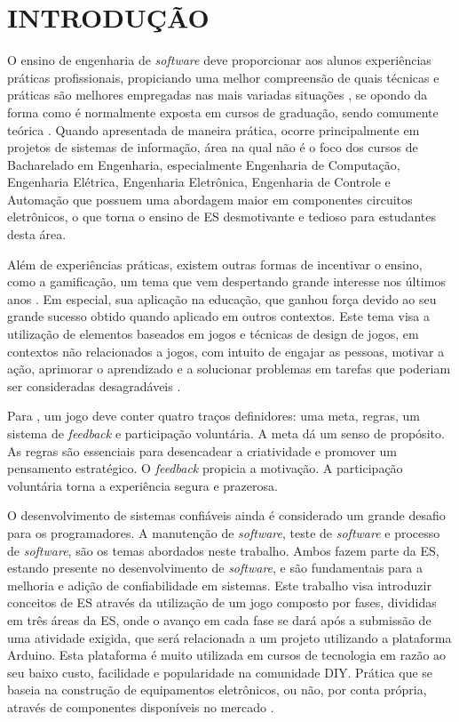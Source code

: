 
\chapter{INTRODUÇÃO}
\label{chap:introducao}

O ensino de engenharia de \textit{software} deve proporcionar aos alunos experiências práticas profissionais, propiciando uma melhor compreensão de quais técnicas e práticas são melhores empregadas nas mais variadas situações \cite{Figueiredo2017}, se opondo da forma como é normalmente exposta em cursos de graduação, sendo comumente teórica \cite{Souza2010}. Quando apresentada de maneira prática, ocorre principalmente em projetos de sistemas de informação, área na qual não é o foco dos cursos de Bacharelado em Engenharia, especialmente Engenharia de Computação, Engenharia Elétrica, Engenharia Eletrônica, Engenharia de Controle e Automação que possuem uma abordagem maior em componentes circuitos eletrônicos, o que torna o ensino de ES desmotivante e tedioso para estudantes desta área.

Além de experiências práticas, existem outras formas de incentivar o ensino, como a gamificação, um tema que vem despertando grande interesse nos últimos anos \cite{Kapp2012}. Em especial, sua aplicação na educação, que ganhou força devido ao seu grande sucesso obtido quando aplicado em outros contextos. Este tema visa a utilização de elementos baseados em jogos e técnicas de design de jogos, em contextos não relacionados a jogos, com intuito de engajar as pessoas, motivar a ação, aprimorar o aprendizado e a solucionar problemas em tarefas que poderiam ser consideradas desagradáveis \cite{Deterding2011, Kapp2012}.

Para , um jogo deve conter quatro traços definidores: uma meta, regras, um sistema de \textit{feedback} e participação voluntária. A meta dá um senso de propósito. As regras são essenciais para desencadear a criatividade e promover um pensamento estratégico. O \textit{feedback} propicia a motivação. A participação voluntária torna a experiência segura e prazerosa.

O desenvolvimento de sistemas confiáveis ainda é considerado um grande desafio para os programadores. A manutenção de \textit{software}, teste de \textit{software} e processo de \textit{software}, são os temas abordados neste trabalho. Ambos fazem parte da ES, estando presente no desenvolvimento de \textit{software}, e são fundamentais para a melhoria e adição de confiabilidade em sistemas. Este trabalho visa introduzir conceitos de ES através da utilização de um jogo composto por fases, divididas em três áreas da ES, onde o avanço em cada fase se dará após a submissão de uma atividade exigida, que será relacionada a um projeto utilizando a plataforma Arduino. Esta plataforma é muito utilizada em cursos de tecnologia em razão ao seu baixo custo, facilidade e popularidade na comunidade DIY. Prática que se baseia na construção de equipamentos eletrônicos, ou não, por conta própria, através de componentes disponíveis no mercado \cite{Kuznetsov2010}.



